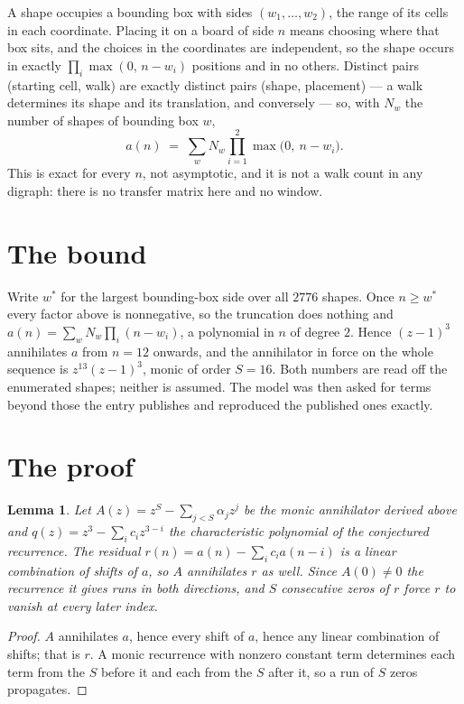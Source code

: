 \documentclass[11pt,a4paper]{article}
\theoremstyle{plain}
\newtheorem{lemma}[theorem]{Lemma}
\theoremstyle{definition}
\begin{document}
A shape occupies a bounding box with sides $(w_1,\dots,w_{2})$, the range of its cells in each
coordinate. Placing it on a board of side $n$ means choosing where that box sits, and the
choices in the coordinates are independent, so the shape occurs in exactly
$\prod_{i}\max(0,\,n-w_i)$ positions and in no others. Distinct pairs (starting cell,
walk) are exactly distinct pairs (shape, placement) --- a walk determines its shape and its
translation, and conversely --- so, with $N_w$ the number of shapes of bounding box $w$,
\[
a(n)\;=\;\sum_{w} N_w \prod_{i=1}^{2}\max\bigl(0,\ n-w_i\bigr).
\]
This is exact for every $n$, not asymptotic, and it is not a walk count in any digraph: there is
no transfer matrix here and no window.

\section{The bound}

Write $w^\ast$ for the largest bounding-box side over all $2776$ shapes. Once $n\ge w^\ast$
every factor above is nonnegative, so the truncation does nothing and
$a(n)=\sum_w N_w\prod_i(n-w_i)$, a polynomial in $n$ of degree $2$. Hence $(z-1)^{3}$
annihilates $a$ from $n=12$ onwards, and the annihilator in force on the whole sequence is
$z^{13}(z-1)^{3}$, monic of order $S=16$. Both numbers are read off the enumerated
shapes; neither is assumed. The model was then asked for terms beyond those the entry publishes
and reproduced the published ones exactly.

\section{The proof}

\begin{lemma}\label{lem:crit}
Let $A(z)=z^S-\sum_{j<S}\alpha_jz^{j}$ be the monic annihilator derived above and
$q(z)=z^{3}-\sum_ic_iz^{3-i}$ the characteristic polynomial of the conjectured
recurrence. The residual $r(n)=a(n)-\sum_ic_ia(n-i)$ is a linear combination of shifts of $a$,
so $A$ annihilates $r$ as well. Since $A(0)\ne0$ the recurrence it gives runs in both
directions, and $S$ consecutive zeros of $r$ force $r$ to vanish at every later index.
\end{lemma}

\begin{proof}
$A$ annihilates $a$, hence every shift of $a$, hence any linear combination of shifts; that is
$r$. A monic recurrence with nonzero constant term determines each term from the $S$ before it
and each from the $S$ after it, so a run of $S$ zeros propagates.
\end{proof}
\end{document}
